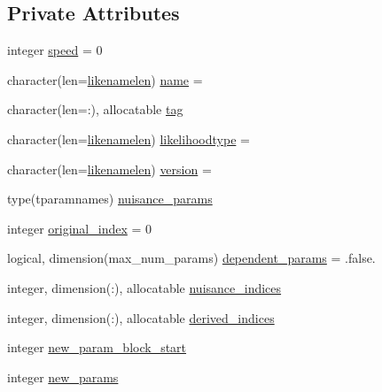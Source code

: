 \subsection*{Private Attributes}
\begin{DoxyCompactItemize}
\item 
integer \mbox{\hyperlink{structgeneraltypes_1_1tdatalikelihood_a9ec1130646897e847fefe2bdc33f549e}{speed}} = 0
\item 
character(len=\mbox{\hyperlink{namespacegeneraltypes_ace8a6f4c868858b72f97b45b87312845}{likenamelen}}) \mbox{\hyperlink{structgeneraltypes_1_1tdatalikelihood_ab116947c45b89221591d5ede47a88522}{name}} = \textquotesingle{}\textquotesingle{}
\item 
character(len=\+:), allocatable \mbox{\hyperlink{structgeneraltypes_1_1tdatalikelihood_a267cb471268d2fbce4e36abc77751b30}{tag}}
\item 
character(len=\mbox{\hyperlink{namespacegeneraltypes_ace8a6f4c868858b72f97b45b87312845}{likenamelen}}) \mbox{\hyperlink{structgeneraltypes_1_1tdatalikelihood_a0864aa3fa5fb45a440171d4fbedfbc94}{likelihoodtype}} = \textquotesingle{}\textquotesingle{}
\item 
character(len=\mbox{\hyperlink{namespacegeneraltypes_ace8a6f4c868858b72f97b45b87312845}{likenamelen}}) \mbox{\hyperlink{structgeneraltypes_1_1tdatalikelihood_a06e1ceca8ba822d79c38cb6d1a69e713}{version}} = \textquotesingle{}\textquotesingle{}
\item 
type(tparamnames) \mbox{\hyperlink{structgeneraltypes_1_1tdatalikelihood_a475e871dbdc4f34a717ddcc153a32f4d}{nuisance\+\_\+params}}
\item 
integer \mbox{\hyperlink{structgeneraltypes_1_1tdatalikelihood_a7e2c79db0298a96c5886c54f0023a35f}{original\+\_\+index}} = 0
\item 
logical, dimension(max\+\_\+num\+\_\+params) \mbox{\hyperlink{structgeneraltypes_1_1tdatalikelihood_a31df3556a5b4e809db64c667a96c0a6a}{dependent\+\_\+params}} = .false.
\item 
integer, dimension(\+:), allocatable \mbox{\hyperlink{structgeneraltypes_1_1tdatalikelihood_a4e71a4a9b58247133b1d716228bfedaf}{nuisance\+\_\+indices}}
\item 
integer, dimension(\+:), allocatable \mbox{\hyperlink{structgeneraltypes_1_1tdatalikelihood_ab00e4ac6941c90872fd2e0af0658cd7f}{derived\+\_\+indices}}
\item 
integer \mbox{\hyperlink{structgeneraltypes_1_1tdatalikelihood_ad5daa1643479fdecdc657ff6bbcab529}{new\+\_\+param\+\_\+block\+\_\+start}}
\item 
integer \mbox{\hyperlink{structgeneraltypes_1_1tdatalikelihood_aed3138c35b09b82656877e812a1314db}{new\+\_\+params}}
\end{DoxyCompactItemize}


